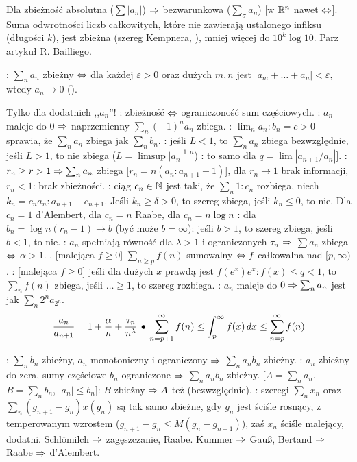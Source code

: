 Dla   zbieżność absolutna ($\sum |a_n|$) $\Rightarrow$ bezwarunkowa ($\sum_{\sigma} a_n$) [w $\mathbb{R}^n$ nawet $\Leftrightarrow$]. %
Suma odwrotności liczb całkowitych, które nie zawierają ustalonego infiksu (długości $k$), jest zbieżna (szereg Kempnera, ), mniej więcej do $10^k \log 10$.
Parz artykuł R. Bailliego. %

: $\sum_n a_n$ zbieżny $\Leftrightarrow$ dla każdej $\varepsilon > 0$ oraz dużych $m, n$ jest $|a_{m} + \dots + a_n| < \varepsilon$, wtedy $a_n \to 0$ ().

Tylko dla dodatnich ,,$a_n$''!
: zbieżność $\Leftrightarrow$ ograniczoność sum częściowych.
: $a_n$ maleje do $0$ $\Rightarrow$ naprzemienny $\sum_n (-1)^n a_n$ zbiega.
: $\lim_n a_n:b_n = c > 0$ sprawia, że $\sum_n a_n$ zbiega jak $\sum_n b_n$.
: jeśli $L < 1$, to $\sum_n a_n$ zbiega bezwzględnie, jeśli $L > 1$, to nie zbiega ($L=\limsup |a_n|^{1 : n}$)
: to samo dla $q = \lim |a_{n+1}/a_n|$]. 
: $r_n \ge r > 1 \Rightarrow \sum_n a_n$ zbiega [$r_n = n(a_n : a_{n+1} - 1)$], dla $r_n \to 1$ brak informacji, $r_n < 1$: brak zbieżności.
: ciąg $c_n \in \mathbb{N}$ jest taki, że $\sum_n 1 : c_n$ rozbiega, niech $k_n = c_n a_n : a_{n+1} - c_{n+1}$.
Jeśli $k_n \ge \delta > 0$, to szereg zbiega, jeśli $k_n \le 0$, to nie.
Dla $c_n = 1$ d'Alembert, dla $c_n = n$ Raabe, dla $c_n = n \log n$ : dla $b_n = \log n(r_n - 1) \to b$ (być może $b = \infty$): jeśli $b > 1$, to szereg zbiega, jeśli $b < 1$, to nie.
: $a_n$ spełniają równość dla $\lambda > 1$ i ograniczonych $\tau_n$ $\Rightarrow$ $\sum a_n$ zbiega $\Leftrightarrow$ $\alpha > 1$.
. [malejąca $f \ge 0$] $\sum_{n\ge p} f(n)$ sumowalny $\Leftrightarrow f$ całkowalna nad $[p, \infty)$. 
: [malejąca $f \ge 0$] jeśli dla dużych $x$ prawdą jest $f(e^x) e^x : f(x) \le q < 1$, to $\sum_n f(n)$ zbiega, jeśli $\ldots \ge 1$, to szereg rozbiega.
: $a_n$ maleje do $0 \Rightarrow \sum_n a_n$ jest jak $\sum_n 2^na_{2^n}$.
\[
	\frac{a_n}{a_{n+1}} = 1 + \frac \alpha n + \frac{\tau_n}{n^\lambda} \spk
	\sum_{n=p+1}^\infty f(n) \le \int_p^\infty f(x) \, dx \le \sum_{n=p}^\infty f(n) \hfill
\]

: $\sum_n b_n$ zbieżny, $a_n$ monotoniczny i ograniczony $\Rightarrow$ $\sum_n a_nb_n$ zbieżny. 
: $a_n$ zbieżny do zera, sumy częściowe $b_n$ ograniczone $\Rightarrow$ $\sum_n a_nb_n$ zbieżny.
 [$A = \sum_n a_n$, $B = \sum_n b_n$, $|a_n| \le b_n$]: $B$ zbieżny $\Rightarrow A$ też (bezwzględnie).
: szeregi $\sum_n x_n$ oraz $\sum_n (g_{n+1} - g_n) x (g_n)$ są tak samo zbieżne, gdy $g_n$ jest ściśle rosnący, z temperowanym wzrostem ($g_{n+1} -g_n \le M (g_n-g_{n-1})$), zaś $x_n$ ściśle malejący, dodatni.
Schlömilch $\Rightarrow$ zagęszczanie, Raabe.
Kummer $\Rightarrow$ Gauß, Bertand $\Rightarrow$ Raabe $\Rightarrow$ d'Alembert.

